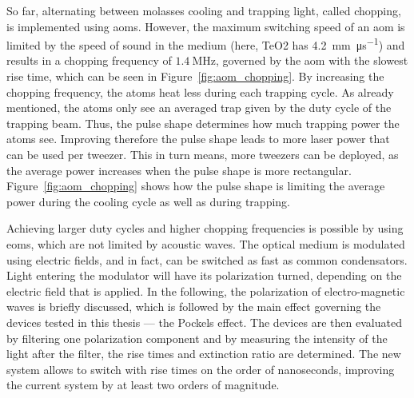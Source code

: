 So far, alternating between molasses cooling and trapping light, called chopping, is implemented using \acp{aom}. However, the maximum switching speed of an \ac{aom} is limited by the speed of sound in the medium (here, TeO2 has \SI{4.2}{\milli\meter\per\micro\second}) and results in a chopping frequency of $\SI{1.4}{\mega\hertz}$, governed by the \ac{aom} with the slowest rise time, which can be seen in Figure~\ref{fig:aom_chopping}. By increasing the chopping frequency, the atoms heat less during each trapping cycle. As already mentioned, the atoms only see an averaged trap given by the duty cycle of the trapping beam. Thus, the pulse shape determines how much trapping power the atoms see. Improving therefore the pulse shape leads to more laser power that can be used per tweezer. This in turn means, more tweezers can be deployed, as the average power increases when the pulse shape is more rectangular. Figure~\ref{fig:aom_chopping} shows how the pulse shape is limiting the average power during the cooling cycle as well as during trapping.

\begin{figure}[t]%
\end{figure}

Achieving larger duty cycles and higher chopping frequencies is possible by using \acp{eom}, which are not limited by acoustic waves. The optical medium is modulated using electric fields, and in fact, can be switched as fast as common condensators. Light entering the modulator will have its polarization turned, depending on the electric field that is applied. In the following, the polarization of electro-magnetic waves is briefly discussed, which is followed by the main effect governing the devices tested in this thesis --- the Pockels effect. The devices are then evaluated by filtering one polarization component and by measuring the intensity of the light after the filter, the rise times and extinction ratio are determined. The new system allows to switch with rise times on the order of nanoseconds, improving the current system by at least two orders of magnitude.

